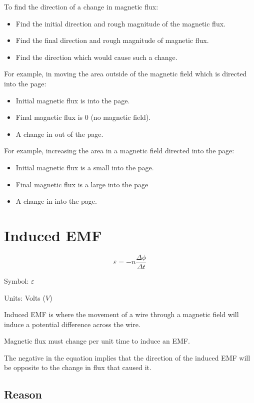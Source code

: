 \documentclass[a4paper,11pt]{article}
\begin{document}
To find the direction of a change in magnetic flux:

\begin{itemize}
\item Find the initial direction and rough magnitude of the magnetic flux.
\item Find the final direction and rough magnitude of magnetic flux.
\item Find the direction which would cause such a change.
\end{itemize}

For example, in moving the area outside of the magnetic field which is directed
into the page:

\begin{itemize}
\item Initial magnetic flux is into the page.
\item Final magnetic flux is 0 (no magnetic field).
\item A change in out of the page.
\end{itemize}

For example, increasing the area in a magnetic field directed into the page:

\begin{itemize}
\item Initial magnetic flux is a small into the page.
\item Final magnetic flux is a large into the page
\item A change in into the page.
\end{itemize}




\section{Induced EMF}

$$
\varepsilon = -n \frac{\Delta \phi}{\Delta t}
$$

Symbol: $\varepsilon$

Units: Volts ($V$)

Induced EMF is where the movement of a wire through a magnetic field will induce
a potential difference across the wire.

Magnetic flux must change per unit time to induce an EMF.

The negative in the equation implies that the direction of the induced EMF will
be opposite to the change in flux that caused it.


\subsection{Reason}
\end{document}
